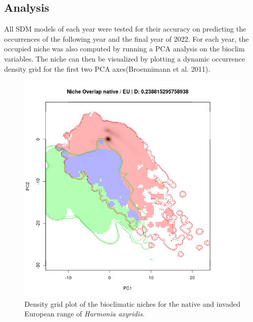 \documentclass[12pt]{article}
\begin{document}
\subsection{Analysis}
All SDM models of each year were tested for their accuracy on predicting the occurrences of the following year and the final year of 2022. 
For each year, the occupied niche was also computed by running a PCA analysis on the bioclim variables. The niche can then be visualized by plotting a dynamic occurrence density grid for the first two PCA axes(Broennimann et al. 2011). 

\begin{figure}[h]
\centering
\includegraphics[width = 0.6 \linewidth]{pictures/as-eu-niche.png}
\caption{\label{fig:as-eu-niche} Density grid plot of the bioclimatic niches for the native and invaded European range of \textit{Harmonia axyridis}.}
\end{figure}
\end{document}
